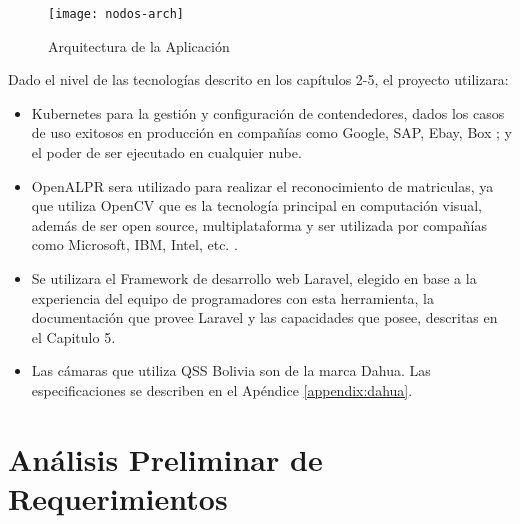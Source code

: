         \begin{figure}[H]
            \centering
            \texttt{[image: nodos-arch]}
            \caption{Arquitectura de la Aplicación}
            \label{fig:nodos-arch}
        \end{figure} 
        
        Dado el nivel de las tecnologías descrito en los capítulos 2-5, el proyecto utilizara:
        \begin{itemize}
            \item Kubernetes para la gestión y configuración de contendedores, dados los casos de uso exitosos en producción en compañías como Google, SAP, Ebay, Box \cite{Kubernetes2016-ub}; y el poder de ser ejecutado en cualquier nube.
            \item OpenALPR sera utilizado para realizar el reconocimiento de matriculas, ya que utiliza OpenCV que es la tecnología principal en computación visual, además de ser open source, multiplataforma y ser utilizada por compañías como Microsoft, IBM, Intel, etc. \cite{Itseez2000-he}.
            \item Se utilizara el Framework de desarrollo web Laravel, elegido en base a la experiencia del equipo de programadores con esta herramienta, la documentación que provee Laravel y las capacidades que posee, descritas en el Capitulo 5.
            \item Las cámaras que utiliza QSS Bolivia son de la marca Dahua. Las especificaciones se describen en el Apéndice \ref{appendix:dahua}.
        \end{itemize}

    \section{Análisis Preliminar de Requerimientos}
